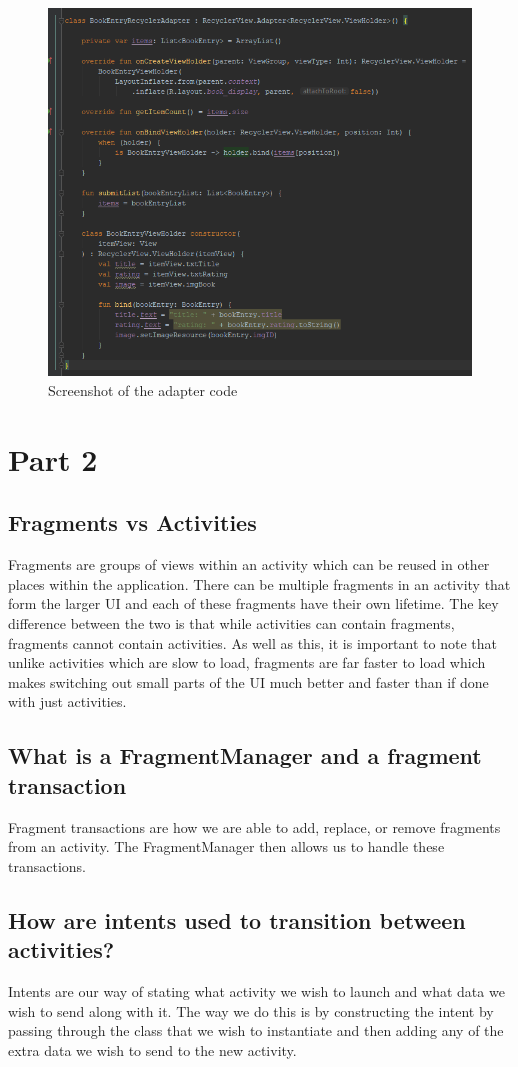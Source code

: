 \documentclass{scrartcl}
\begin{document}
\begin{figure}[h]
    \centering
    \includegraphics[scale=0.7]{images/screen2.png}
    \caption{Screenshot of the adapter code}
\end{figure}

\pagebreak

\section*{Part 2}

\subsection*{Fragments vs Activities}
Fragments are groups of views within an activity which can be reused in other places within
the application. There can be multiple fragments in an activity that form the larger UI
and each of these fragments have their own lifetime. The key difference between the two
is that while activities can contain fragments, fragments cannot contain activities. As
well as this, it is important to note that unlike activities which are slow to load,
fragments are far faster to load which makes switching out small parts of the UI much
better and faster than if done with just activities.

\subsection*{What is a FragmentManager and a fragment transaction}
Fragment transactions are how we are able to add, replace, or remove fragments from an
activity. The FragmentManager then allows us to handle these transactions.

\subsection*{How are intents used to transition between activities?}
Intents are our way of stating what activity we wish to launch and what data we wish to
send along with it. The way we do this is by constructing the intent by passing through
the class that we wish to instantiate and then adding any of the extra data we wish
to send to the new activity.
\end{document}
